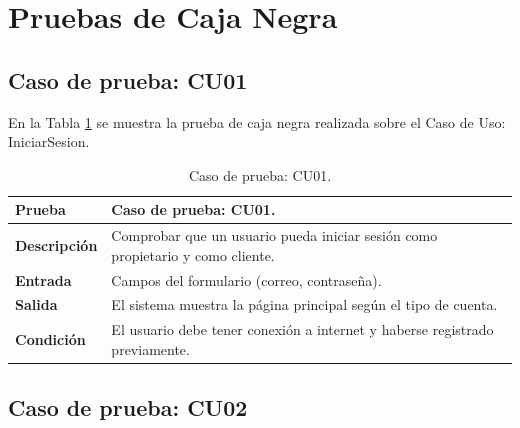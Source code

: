 
\section{Pruebas de Caja Negra}


\subsection{Caso de prueba: CU01}

En la Tabla \ref{tab:cu01_black_test} se muestra la prueba de caja negra realizada sobre el Caso de Uso: IniciarSesion.

\begin{table}[ht]
\centering
\renewcommand{\arraystretch}{1.3}
\begin{tabular}{|p{3cm}|p{12cm}|}
\hline
\rowcolor[RGB]{191,191,191}
\textbf{Prueba} & Caso de prueba: CU01. \\
\hline
\textbf{Descripción} \cellcolor[RGB]{217,217,217} & Comprobar que un usuario pueda iniciar sesión como propietario y como cliente. \\
\hline
\textbf{Entrada} \cellcolor[RGB]{217,217,217} & Campos del formulario (correo, contraseña). \\
\hline
\textbf{Salida} \cellcolor[RGB]{217,217,217} & El sistema muestra la página principal según el tipo de cuenta. \\
\hline
\textbf{Condición} \cellcolor[RGB]{217,217,217} & El usuario debe tener conexión a internet y haberse registrado previamente. \\
\hline
\end{tabular}
\caption{Caso de prueba: CU01.}
\label{tab:cu01_black_test}
\end{table}


\subsection{Caso de prueba: CU02}

